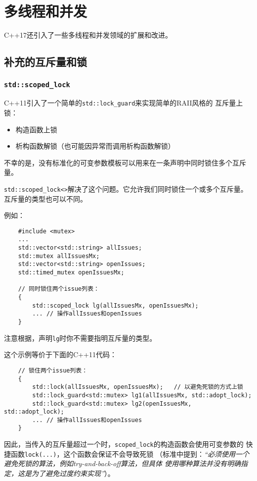 \chapter{多线程和并发}\label{ch27}
C++17还引入了一些多线程和并发领域的扩展和改进。


\section{补充的互斥量和锁}

\subsection{\texttt{std::scoped\_lock}}\label{ch27.1.1}
C++11引入了一个简单的\texttt{std::lock\_guard}来实现简单的RAII风格的
互斥量上锁：
\begin{itemize}
    \item 构造函数上锁
    \item 析构函数解锁（也可能因异常而调用析构函数解锁）
\end{itemize}
不幸的是，没有标准化的可变参数模板可以用来在一条声明中同时锁住多个互斥量。

\texttt{std::scoped\_lock<>}解决了这个问题。它允许我们同时锁住一个或多个互斥量。
互斥量的类型也可以不同。

例如：
\begin{lstlisting}
    #include <mutex>
    ...
    std::vector<std::string> allIssues;
    std::mutex allIssuesMx;
    std::vector<std::string> openIssues;
    std::timed_mutex openIssuesMx;

    // 同时锁住两个issue列表：
    {
        std::scoped_lock lg(allIssuesMx, openIssuesMx);
        ... // 操作allIssues和openIssues
    }
\end{lstlisting}
注意根据，声明\texttt{lg}时你不需要指明互斥量的类型。

这个示例等价于下面的C++11代码：
\begin{lstlisting}
    // 锁住两个issue列表：
    {
        std::lock(allIssuesMx, openIssuesMx);   // 以避免死锁的方式上锁
        std::lock_guard<std::mutex> lg1(allIssuesMx, std::adopt_lock);
        std::lock_guard<std::mutex> lg2(openIssuesMx, std::adopt_lock);
        ... // 操作allIssues和openIssues
    }
\end{lstlisting}
因此，当传入的互斥量超过一个时，\texttt{scoped\_lock}的构造函数会使用可变参数的
快捷函数\texttt{lock(...)}，这个函数会保证不会导致死锁
（标准中提到：\emph{“必须使用一个避免死锁的算法，例如try-and-back-off算法，但具体
使用哪种算法并没有明确指定，这是为了避免过度约束实现”}）。

